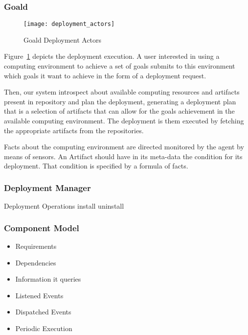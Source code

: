 \subsubsection{Goald}
\label{sec:goald}


\begin{figure}[!htb]
  \centering
  \texttt{[image: deployment\_actors]}
  \caption{Goald Deployment Actors}
\label{fig:deployment_actors}
\end{figure}

Figure~\ref{fig:deployment_actors} depicts the deployment execution. A user interested in using a computing environment to achieve a set of goals submits to this environment which goals it want to achieve in the form of a deployment request.

Then, our system introspect about available computing resources and artifacts present in repository and plan the deployment, generating a deployment plan that is a selection of artifacts that can allow for the goals achievement in the available computing environment. The deployment is them executed by fetching the appropriate artifacts from the repositories.

Facts about the computing environment are directed monitored by the agent by means of sensors. An Artifact should have in its meta-data the condition for its deployment. That condition is specified by a formula of facts.

\subsubsection{Deployment Manager}

Deployment Operations
install
uninstall

\subsubsection{Component Model}
\begin{itemize}
  \item Requirements
  \item Dependencies
\end{itemize}

\begin{itemize}
    \item Information it queries
    \item Listened Events
    \item Dispatched Events
    \item Periodic Execution
\end{itemize}


